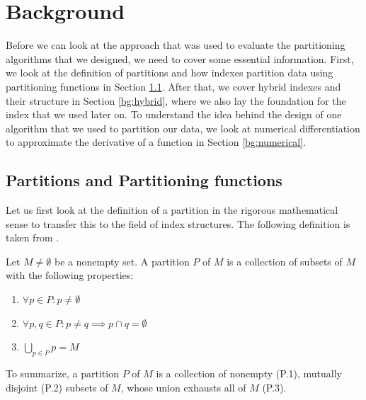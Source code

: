 \thispagestyle{plain}
\chapter{Background}

Before we can look at the approach that was used to evaluate the partitioning algorithms that we designed, we need to cover some essential information. First, we look at the definition of partitions and how indexes partition data using partitioning functions in Section \ref{bg:partitions}. After that, we cover hybrid indexes and their structure in Section \ref{bg:hybrid}, where we also lay the foundation for the index that we used later on. To understand the idea behind the design of one algorithm that we used to partition our data, we look at numerical differentiation to approximate the derivative of a function in Section \ref{bg:numerical}.

\section{Partitions and Partitioning functions}\label{bg:partitions}
Let us first look at the definition of a partition in the rigorous mathematical sense to transfer this to the field of index structures. The following definition is taken from \citeauthor{Lucas1990} \cite{Lucas1990}.

\vspace{0.5cm}
\begin{definition}[Partition]
Let $M \neq \emptyset$ be a nonempty set. A partition $P$ of $M$ is a collection of subsets of $M$ with the following properties:

\begin{enumerate}
    \item[P.1] $\forall p \in P: p \neq \emptyset$
    \item[P.2] $\forall p,q \in P: p \neq q \implies p \cap q = \emptyset$
    \item[P.3] $\bigcup_{p \in P} p = M$
\end{enumerate}

\noindent To summarize, a partition $P$ of $M$ is a collection of nonempty (P.1), mutually disjoint (P.2) subsets of $M$, whose union exhausts all of $M$ (P.3).
\end{definition}

